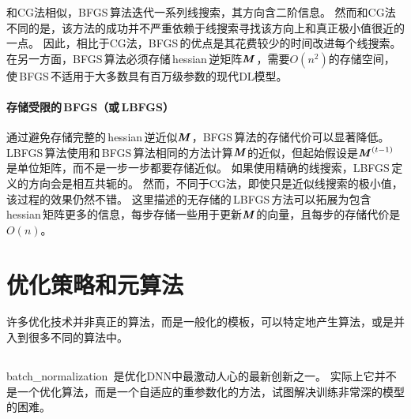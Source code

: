 和\gls{CG}法相似，\gls{BFGS}\,算法迭代一系列线搜索，其方向含二阶信息。
然而和\gls{CG}法不同的是，该方法的成功并不严重依赖于线搜索寻找该方向上和真正极小值很近的一点。
因此，相比于\gls{CG}法，\gls{BFGS}\,的优点是其花费较少的时间改进每个线搜索。
在另一方面，\gls{BFGS}\,算法必须存储\,\gls{hessian}\,逆矩阵$\boldsymbol{\mathit{M}}$，需要$O(n^2)$的存储空间，使\,\gls{BFGS}\,不适用于大多数具有百万级参数的现代\gls{DL}模型。

\paragraph{存储受限的\,\gls{BFGS}（或\,\gls{LBFGS}）}
通过避免存储完整的\,\gls{hessian}\,逆近似$\boldsymbol{\mathit{M}}$，\gls{BFGS}\,算法的存储代价可以显著降低。
\gls{LBFGS}\,算法使用和\,\gls{BFGS}\,算法相同的方法计算$\boldsymbol{\mathit{M}}$的近似，但起始假设是$\boldsymbol{\mathit{M}}^{(t-1)}$是单位矩阵，而不是一步一步都要存储近似。
如果使用精确的线搜索，\gls{LBFGS}\,定义的方向会是相互共轭的。
然而，不同于\gls{CG}法，即使只是近似线搜索的极小值，该过程的效果仍然不错。
这里描述的无存储的\,\gls{LBFGS}\,方法可以拓展为包含\,\gls{hessian}\,矩阵更多的信息，每步存储一些用于更新$\boldsymbol{\mathit{M}}$的向量，且每步的存储代价是$O(n)$。


\section{优化策略和元算法}
\label{sec:optimization_strategies_and_meta_algorithms}
许多优化技术并非真正的算法，而是一般化的模板，可以特定地产生算法，或是并入到很多不同的算法中。

\subsection{}
\label{sec:batch_normalization}
\gls{batch_normalization}~\citep{Ioffe+Szegedy-2015}是优化\gls{DNN}中最激动人心的最新创新之一。
实际上它并不是一个优化算法，而是一个自适应的重参数化的方法，试图解决训练非常深的模型的困难。

